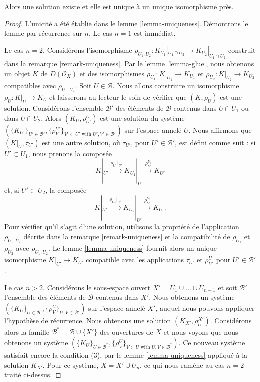 {\begin{lemma}
\begin{enumerate}
\end{enumerate}

Alors une solution existe et elle est unique à un unique isomorphisme près.

\end{lemma}

\begin{proof}
L'unicité a été établie dans le lemme \ref{lemma-uniqueness}. Démontrons le lemme par récurrence sur $n$. Le cas $n = 1$ est immédiat.

\medskip\noindent

Le cas $n = 2$. Considérons l'isomorphisme
$\rho_{U_1, U_2} : K_{U_1}|_{U_1 \cap U_2} \to K_{U_2}|_{U_1 \cap U_2}$
construit dans la remarque \ref{remark-uniqueness}. Par le lemme \ref{lemma-glue}, nous obtenons un objet $K$ de $D(\mathcal{O}_X)$
et des isomorphismes $\rho_{U_1} : K|_{U_1} \to K_{U_1}$ et
$\rho_{U_2} : K|_{U_2} \to K_{U_2}$ compatibles avec $\rho_{U_1, U_2}$. Soit $U \in \mathcal{B}$. Nous allons construire un isomorphisme
$\rho_U : K|_U \to K_U$ et laisserons au lecteur le soin de vérifier que $(K, \rho_U)$ est une solution. Considérons l'ensemble $\mathcal{B}'$
des éléments de $\mathcal{B}$ contenus dans $U \cap U_1$ ou dans
$U \cap U_2$. Alors $(K_U, \rho^U_{U'})$ est une solution du système
$(\{K_{U'}\}_{U' \in \mathcal{B}'},
\{\rho_{V'}^{U'}\}_{V' \subset U'\text{ with }U', V' \in \mathcal{B}'})$
sur l'espace annelé $U$. Nous affirmons que $(K|_U, \tau_{U'})$ est une autre solution, où
$\tau_{U'}$, pour $U' \in \mathcal{B}'$, est défini comme suit : si $U' \subset U_1$, nous prenons la composée
$$
K|_{U'} \xrightarrow{\rho_{U_1}|_{U'}}
K_{U_1}|_{U'} \xrightarrow{\rho^{U_1}_{U'}}
K_{U'}
$$
et, si $U' \subset U_2$, la composée
$$
K|_{U'} \xrightarrow{\rho_{U_2}|_{U'}}
K_{U_2}|_{U'} \xrightarrow{\rho^{U_2}_{U'}}
K_{U'}.
$$
Pour vérifier qu'il s'agit d'une solution, utilisons la propriété de l'application $\rho_{U_1, U_2}$
décrite dans la remarque \ref{remark-uniqueness} et la compatibilité de
$\rho_{U_1}$ et $\rho_{U_2}$ avec $\rho_{U_1, U_2}$. Le lemme \ref{lemma-uniqueness} fournit alors un unique isomorphisme $K|_{U'} \to K_{U'}$ compatible avec les applications $\tau_{U'}$ et
$\rho^U_{U'}$ pour $U' \in \mathcal{B}'$.

\medskip\noindent

Le cas $n > 2$. Considérons le sous-espace ouvert
$X' = U_1 \cup \ldots \cup U_{n - 1}$ et soit $\mathcal{B}'$ l'ensemble des éléments de $\mathcal{B}$ contenus dans $X'$. Nous obtenons un système
$(\{K_U\}_{U \in \mathcal{B}'}, \{\rho_V^U\}_{U, V \in \mathcal{B}'})$
sur l'espace annelé $X'$, auquel nous pouvons appliquer l'hypothèse de récurrence. Nous obtenons une solution $(K_{X'}, \rho^{X'}_U)$. Considérons alors la famille
$\mathcal{B}^* = \mathcal{B} \cup \{X'\}$ des ouvertures de $X$ et nous voyons que nous obtenons un système
$(\{K_U\}_{U \in \mathcal{B}^*},
\{\rho_V^U\}_{V \subset U\text{ with }U, V \in \mathcal{B}^*})$. Ce nouveau système satisfait encore la condition (3), par le lemme \ref{lemma-uniqueness} appliqué à la solution $K_{X'}$. Pour ce système, $X = X' \cup U_n$, ce qui nous ramène au cas $n = 2$ traité ci-dessus.


\end{proof}}
